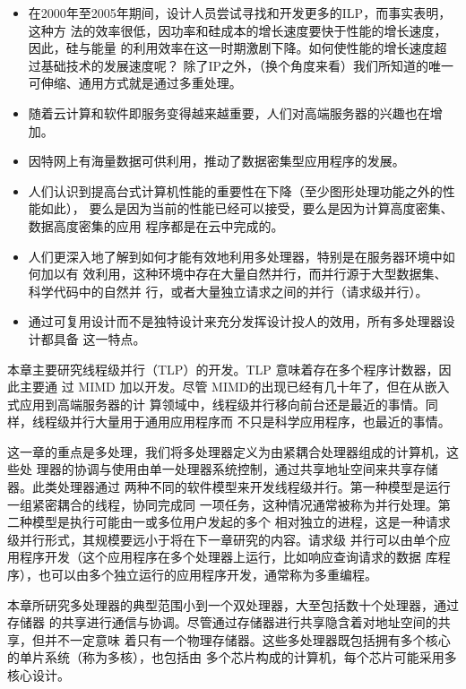 \begin{itemize}
    \item 在2000年至2005年期间，设计人员尝试寻找和开发更多的ILP，而事实表明，这种方
    法的效率很低，因功率和硅成本的增长速度要快于性能的增长速度，因此，硅与能量
    的利用效率在这一时期激剧下降。如何使性能的增长速度超过基础技术的发展速度呢？
    除了IP之外，（换个角度来看）我们所知道的唯一可伸缩、通用方式就是通过多重处理。
    \item 随着云计算和软件即服务变得越来越重要，人们对高端服务器的兴趣也在增加。
    \item 因特网上有海量数据可供利用，推动了数据密集型应用程序的发展。
    \item 人们认识到提高台式计算机性能的重要性在下降（至少图形处理功能之外的性能如此），
    要么是因为当前的性能已经可以接受，要么是因为计算高度密集、数据高度密集的应用
    程序都是在云中完成的。
    \item 人们更深入地了解到如何才能有效地利用多处理器，特别是在服务器环境中如何加以有
    效利用，这种环境中存在大量自然并行，而并行源于大型数据集、科学代码中的自然并
    行，或者大量独立请求之间的并行（请求级并行）。
    \item 通过可复用设计而不是独特设计来充分发挥设计投人的效用，所有多处理器设计都具备
    这一特点。
\end{itemize}
本章主要研究线程级并行（TLP）的开发。TLP 意味着存在多个程序计数器，因此主要通
过 MIMD 加以开发。尽管 MIMD的出现已经有几十年了，但在从嵌入式应用到高端服务器的计
算领域中，线程级并行移向前台还是最近的事情。同样，线程级并行大量用于通用应用程序而
不只是科学应用程序，也最近的事情。

这一章的重点是多处理，我们将多处理器定义为由紧耦合处理器组成的计算机，这些处
理器的协调与使用由单一处理器系统控制，通过共享地址空间来共享存储器。此类处理器通过
两种不同的软件模型来开发线程级并行。第一种模型是运行一组紧密耦合的线程，协同完成同
一项任务，这种情况通常被称为并行处理。第二种模型是执行可能由一或多位用户发起的多个
相对独立的进程，这是一种请求级并行形式，其规模要远小于将在下一章研究的内容。请求级
并行可以由单个应用程序开发（这个应用程序在多个处理器上运行，比如响应查询请求的数据
库程序），也可以由多个独立运行的应用程序开发，通常称为多重编程。

本章所研究多处理器的典型范围小到一个双处理器，大至包括数十个处理器，通过存储器
的共享进行通信与协调。尽管通过存储器进行共享隐含着对地址空间的共享，但并不一定意味
着只有一个物理存储器。这些多处理器既包括拥有多个核心的单片系统（称为多核），也包括由
多个芯片构成的计算机，每个芯片可能采用多核心设计。

